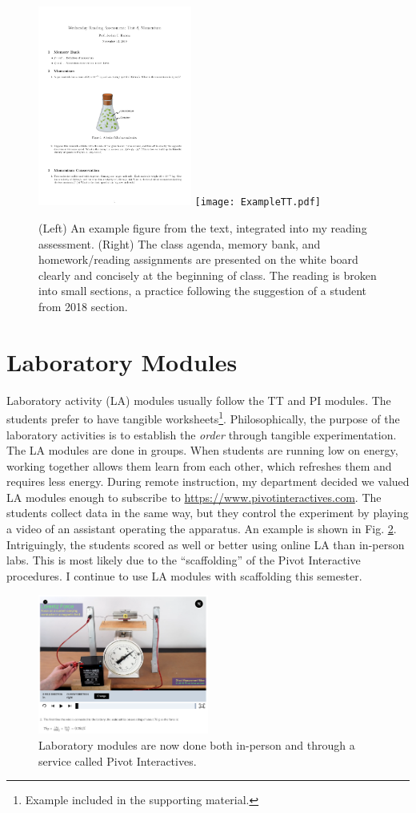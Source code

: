 \documentclass[../../../main.tex]{subfiles}
\begin{document}
\begin{figure}
\centering
\includegraphics[width=0.45\textwidth]{figures/readingassessment.png}
\texttt{[image: ExampleTT.pdf]}
\caption{\label{fig:read} (Left) An example figure from the text, integrated into my reading assessment.  (Right) The class agenda, memory bank, and homework/reading assignments are presented on the white board clearly and concisely at the beginning of class.  The reading is broken into small sections, a practice following the suggestion of a student from 2018 section.}
\end{figure}

\section{Laboratory Modules}
\label{sec:la}

Laboratory activity (LA) modules usually follow the TT and PI modules.  The students prefer to have tangible worksheets\footnote{Example included in the supporting material.}.  Philosophically, the purpose of the laboratory activities is to establish the \textit{order} through tangible experimentation.  The LA modules are done in groups.  When students are running low on energy, working together allows them learn from each other, which refreshes them and requires less energy.  During remote instruction, my department decided we valued LA modules enough to subscribe to \url{https://www.pivotinteractives.com}.  The students collect data in the same way, but they control the experiment by playing a video of an assistant operating the apparatus.  An example is shown in Fig. \ref{fig:pivot}.  Intriguingly, the students scored as well or better using online LA than in-person labs.  This is most likely due to the ``scaffolding'' of the Pivot Interactive procedures.  I continue to use LA modules with scaffolding this semester.

\begin{figure}
\centering
\includegraphics[width=0.5\textwidth]{figures/pivot.png}
\caption{\label{fig:pivot}  Laboratory modules are now done both in-person and through a service called Pivot Interactives.}
\end{figure}
\end{document}

